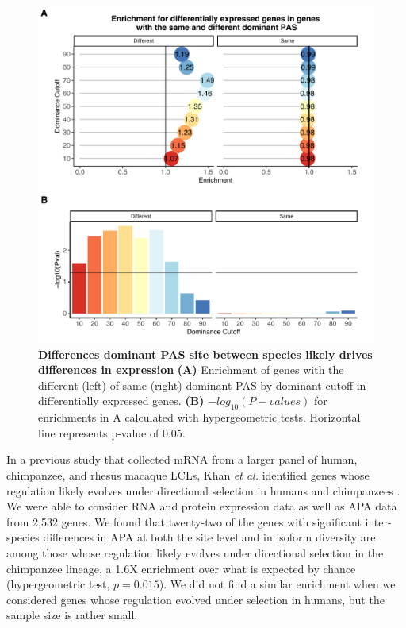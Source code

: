 \begin{figure}
\centering
\includegraphics[width=5in]{img/ch03/fig4.pdf}
\caption[Differences dominant PAS site between species likely drives differences in expression]{\textbf{Differences dominant PAS site between species likely drives differences in expression} \small {\bf (A)} Enrichment of genes with the different (left) of same (right) dominant PAS by dominant cutoff in differentially expressed genes. {\bf (B)} $-log_{10}(P-values)$ for enrichments in A calculated with hypergeometric tests. Horizontal line represents p-value of 0.05.} 
\label{fig:Ch3fig4}
\end{figure}


In a previous study that collected mRNA from a larger panel of human, chimpanzee, and rhesus macaque LCLs, Khan \emph{et al.} identified genes whose regulation likely evolves under directional selection in humans and chimpanzees \citep{khan_primate_2013}. We were able to consider RNA and protein expression data as well as APA data from 2,532 genes. We found that twenty-two of the genes with significant inter-species differences in APA at both the site level and in isoform diversity are among those whose regulation likely evolves under directional selection in the chimpanzee lineage, a 1.6X enrichment over what is expected by chance (hypergeometric test, $p=0.015$). We did not find a similar enrichment when we considered genes whose regulation evolved under selection in humans, but the sample size is rather small. 



